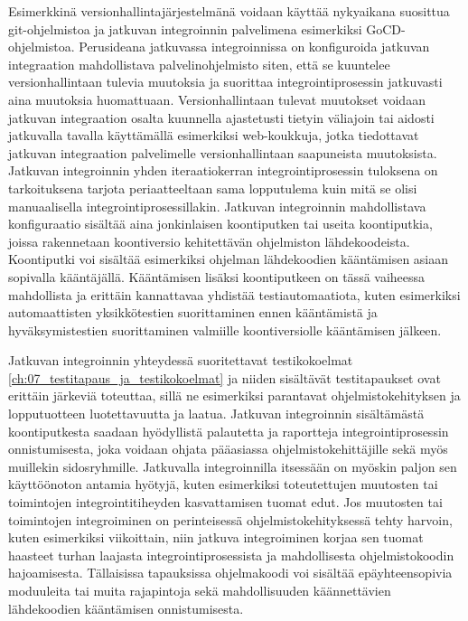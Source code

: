   Esimerkkinä versionhallintajärjestelmänä voidaan käyttää nykyaikana suosittua git-ohjelmistoa ja jatkuvan integroinnin palvelimena esimerkiksi GoCD-ohjelmistoa.
  Perusideana jatkuvassa integroinnissa on konfiguroida jatkuvan integraation mahdollistava palvelinohjelmisto siten, että se kuuntelee versionhallintaan tulevia muutoksia ja suorittaa integrointiprosessin jatkuvasti aina muutoksia huomattuaan.
  Versionhallintaan tulevat muutokset voidaan jatkuvan integraation osalta kuunnella ajastetusti tietyin väliajoin tai aidosti jatkuvalla tavalla käyttämällä esimerkiksi web-koukkuja, jotka tiedottavat jatkuvan integraation palvelimelle versionhallintaan saapuneista muutoksista.
  Jatkuvan integroinnin yhden iteraatiokerran integrointiprosessin tuloksena on tarkoituksena tarjota periaatteeltaan sama lopputulema kuin mitä se olisi manuaalisella integrointiprosessillakin.
  Jatkuvan integroinnin mahdollistava konfiguraatio sisältää aina jonkinlaisen koontiputken tai useita koontiputkia, joissa rakennetaan koontiversio kehitettävän ohjelmiston lähdekoodeista.
  Koontiputki voi sisältää esimerkiksi ohjelman lähdekoodien kääntämisen asiaan sopivalla kääntäjällä.
  Kääntämisen lisäksi koontiputkeen on tässä vaiheessa mahdollista ja erittäin kannattavaa yhdistää testiautomaatiota, kuten esimerkiksi automaattisten yksikkötestien suorittaminen ennen kääntämistä ja hyväksymistestien suorittaminen valmiille koontiversiolle kääntämisen jälkeen.

  Jatkuvan integroinnin yhteydessä suoritettavat testikokoelmat \ref{ch:07_testitapaus_ja_testikokoelmat} ja niiden sisältävät testitapaukset ovat erittäin järkeviä toteuttaa, sillä ne esimerkiksi parantavat ohjelmistokehityksen ja lopputuotteen luotettavuutta ja laatua.
  Jatkuvan integroinnin sisältämästä koontiputkesta saadaan hyödyllistä palautetta ja raportteja integrointiprosessin onnistumisesta, joka voidaan ohjata pääasiassa ohjelmistokehittäjille sekä myös muillekin sidosryhmille.
  Jatkuvalla integroinnilla itsessään on myöskin paljon sen käyttöönoton antamia hyötyjä, kuten esimerkiksi toteutettujen muutosten tai toimintojen integrointitiheyden kasvattamisen tuomat edut.
  Jos muutosten tai toimintojen integroiminen on perinteisessä ohjelmistokehityksessä tehty harvoin, kuten esimerkiksi viikoittain, niin jatkuva integroiminen korjaa sen tuomat haasteet turhan laajasta integrointiprosessista ja mahdollisesta ohjelmistokoodin hajoamisesta.
  Tällaisissa tapauksissa ohjelmakoodi voi sisältää epäyhteensopivia moduuleita tai muita rajapintoja sekä mahdollisuuden käännettävien lähdekoodien kääntämisen onnistumisesta.

